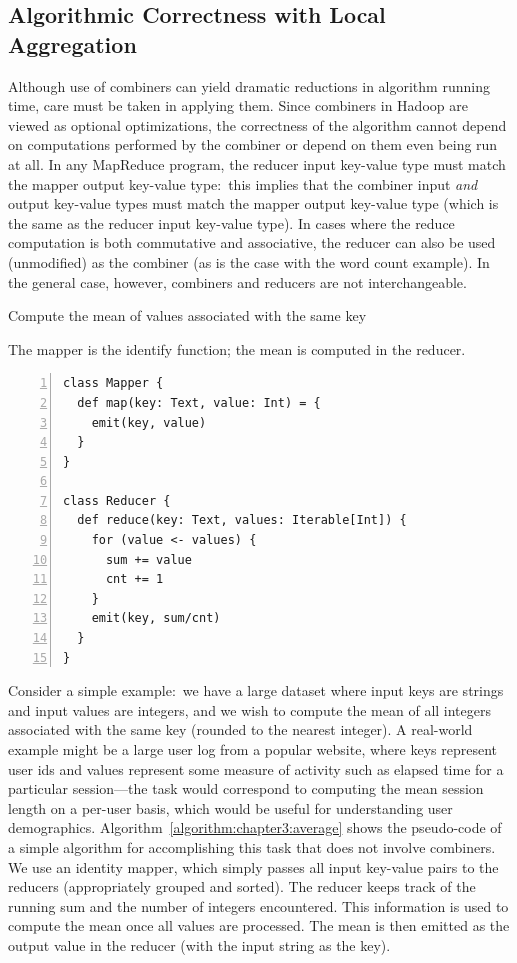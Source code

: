 \subsection{Algorithmic Correctness with Local Aggregation}
\label{chapter3:local-aggregation:correctness}

Although use of combiners can yield dramatic reductions in algorithm
running time, care must be taken in applying them.  Since combiners in
Hadoop are viewed as optional optimizations, the correctness of the
algorithm cannot depend on computations performed by the combiner or
depend on them even being run at all.  In any MapReduce program, the
reducer input key-value type must match the mapper output key-value
type:\ this implies that the combiner input \emph{and} output key-value
types must match the mapper output key-value type (which is the same
as the reducer input key-value type).  In cases where the reduce
computation is both commutative and associative, the reducer can also
be used (unmodified) as the combiner (as is the case with the word
count example).  In the general case, however, combiners and reducers
are not interchangeable.

\begin{algorithm}[t]
\caption{Compute the mean of values associated with the same key}
\label{algorithm:chapter3:average}
The mapper is the identify function; the mean is computed in the reducer.
\begin{small}
\begin{Verbatim}[numbers=left, xleftmargin=7.5mm]
class Mapper {
  def map(key: Text, value: Int) = {
    emit(key, value)
  }
}

class Reducer {
  def reduce(key: Text, values: Iterable[Int]) {
    for (value <- values) {
      sum += value
      cnt += 1
    }
    emit(key, sum/cnt)
  }
}
\end{Verbatim}
\end{small}
\end{algorithm}

Consider a simple example:\ we have a large dataset where input keys
are strings and input values are integers, and we wish to compute the
mean of all integers associated with the same key (rounded to the
nearest integer).  A real-world example might be a large user log from
a popular website, where keys represent user ids and values represent
some measure of activity such as elapsed time for a particular
session---the task would correspond to computing the mean session
length on a per-user basis, which would be useful for understanding
user demographics.  Algorithm~\ref{algorithm:chapter3:average} shows the
pseudo-code of a simple algorithm for accomplishing this task that
does not involve combiners.  We use an identity mapper, which simply
passes all input key-value pairs to the reducers (appropriately
grouped and sorted).  The reducer keeps track of the running sum and
the number of integers encountered.  This information is used to
compute the mean once all values are processed.  The mean is then
emitted as the output value in the reducer (with the input string as
the key).

